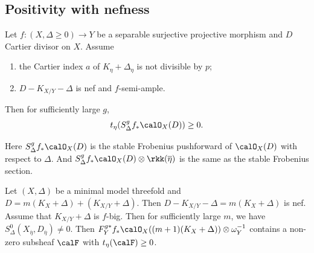 

\subsection{Positivity with nefness}

\begin{theorem}[Zhang'19]
	Let $f: (X, \Delta\geq 0) \to Y$ be a separable surjective projective morphism and $D$ Cartier divisor on $X$.
	Assume
	\begin{enumerate}
		\item the Cartier index $a$ of $K_{\eta} + \Delta_\eta$ is not divisible by $p$;
		\item $D - K_{X/Y} - \Delta$ is nef and $f$-semi-ample.
	\end{enumerate}
	Then for sufficiently large $g$,
	\[ t_\eta(S_\Delta^g f_* \calO_X(D)) \geq 0. \]
\end{theorem}

Here $S_\Delta^g f_* \calO_X(D)$ is the stable Frobenius pushforward of $\calO_X(D)$ with respect to $\Delta$.
And $S_\Delta^g f_* \calO_X(D) \otimes \rkk(\overline{\eta})$ is the same as the stable Frobenius section.

\begin{remark}
	Let $(X, \Delta)$ be a minimal model threefold and $D = m(K_X + \Delta) + (K_{X/Y} + \Delta)$.
	Then $D - K_{X/Y} - \Delta = m(K_X + \Delta)$ is nef.
	Assume that $K_{X/Y} + \Delta$ is $f$-big.
	Then for sufficiently large $m$, we have $S_\Delta^0(X_{\overline{\eta}}, D_{\overline{\eta}}) \neq 0$.
	Then $F_Y^{g*} f_* \calO_X((m+1)(K_{X}+ \Delta)) \otimes \omega_Y^{-1}$ contains a non-zero subsheaf $\calF$ with $t_\eta(\calF) \geq 0$.
\end{remark}

